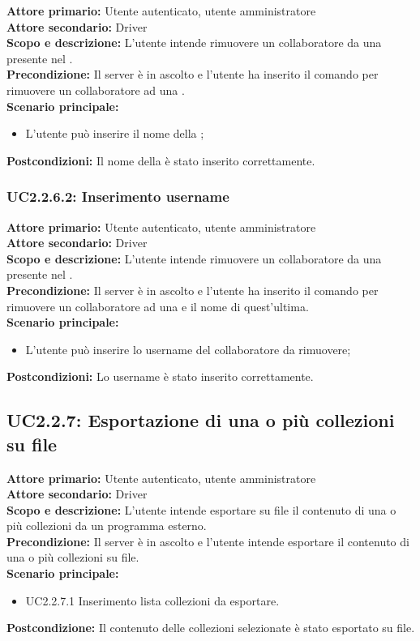 \documentclass{scalatekids-article}
\begin{document}
\textbf{Attore primario:} Utente autenticato, utente amministratore\\
\textbf{Attore secondario:} Driver\\
\textbf{Scopo e descrizione:} L’utente intende rimuovere un collaboratore da una  presente nel .\\
\textbf{Precondizione:} Il server è in ascolto e l’utente ha inserito il comando per rimuovere un collaboratore ad una .\\
\textbf{Scenario principale:}
\begin{itemize}
\item L'utente può inserire il nome della ;
\end{itemize}
\textbf{Postcondizioni:} Il nome della  è stato inserito correttamente.

\subsubsection{UC2.2.6.2: Inserimento username}

\textbf{Attore primario:} Utente autenticato, utente amministratore\\
\textbf{Attore secondario:} Driver\\
\textbf{Scopo e descrizione:} L’utente intende rimuovere un collaboratore da una  presente nel .\\
\textbf{Precondizione:} Il server è in ascolto e l’utente ha inserito il comando per rimuovere un collaboratore ad una  e il nome di quest'ultima.\\
\textbf{Scenario principale:}
\begin{itemize}
\item L'utente può inserire lo username del collaboratore da rimuovere;
\end{itemize}
\textbf{Postcondizioni:} Lo username è stato inserito correttamente.

\subsection{UC2.2.7: Esportazione di una o più collezioni su file}

\textbf{Attore primario:} Utente autenticato, utente amministratore\\
\textbf{Attore secondario:} Driver\\
\textbf{Scopo e descrizione:} L'utente intende esportare su file il contenuto di una o più collezioni da un programma  esterno.\\
\textbf{Precondizione:} Il server è in ascolto e l'utente intende esportare il contenuto di una o più collezioni su file.\\
\textbf{Scenario principale:}
\begin{itemize}
\item UC2.2.7.1 Inserimento lista collezioni da esportare. %
\end{itemize}
\textbf{Postcondizione:} Il contenuto delle collezioni selezionate è stato esportato su file.
\end{document}
